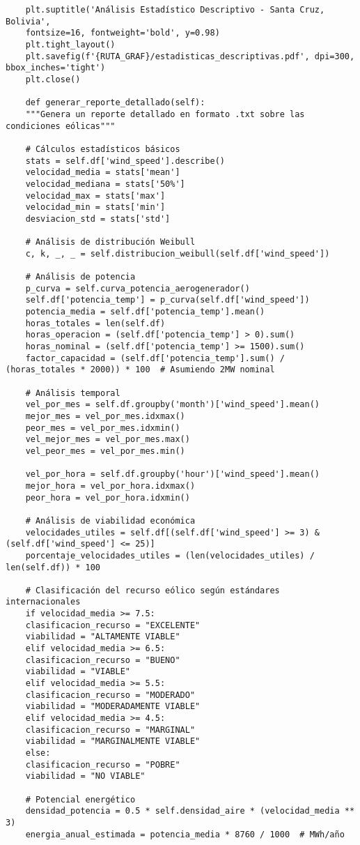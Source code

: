 \begin{lstlisting}
	plt.suptitle('Análisis Estadístico Descriptivo - Santa Cruz, Bolivia', 
	fontsize=16, fontweight='bold', y=0.98)
	plt.tight_layout()
	plt.savefig(f'{RUTA_GRAF}/estadisticas_descriptivas.pdf', dpi=300, bbox_inches='tight')
	plt.close()
	
	def generar_reporte_detallado(self):
	"""Genera un reporte detallado en formato .txt sobre las condiciones eólicas"""
	
	# Cálculos estadísticos básicos
	stats = self.df['wind_speed'].describe()
	velocidad_media = stats['mean']
	velocidad_mediana = stats['50%']
	velocidad_max = stats['max']
	velocidad_min = stats['min']
	desviacion_std = stats['std']
	
	# Análisis de distribución Weibull
	c, k, _, _ = self.distribucion_weibull(self.df['wind_speed'])
	
	# Análisis de potencia
	p_curva = self.curva_potencia_aerogenerador()
	self.df['potencia_temp'] = p_curva(self.df['wind_speed'])
	potencia_media = self.df['potencia_temp'].mean()
	horas_totales = len(self.df)
	horas_operacion = (self.df['potencia_temp'] > 0).sum()
	horas_nominal = (self.df['potencia_temp'] >= 1500).sum()
	factor_capacidad = (self.df['potencia_temp'].sum() / (horas_totales * 2000)) * 100  # Asumiendo 2MW nominal
	
	# Análisis temporal
	vel_por_mes = self.df.groupby('month')['wind_speed'].mean()
	mejor_mes = vel_por_mes.idxmax()
	peor_mes = vel_por_mes.idxmin()
	vel_mejor_mes = vel_por_mes.max()
	vel_peor_mes = vel_por_mes.min()
	
	vel_por_hora = self.df.groupby('hour')['wind_speed'].mean()
	mejor_hora = vel_por_hora.idxmax()
	peor_hora = vel_por_hora.idxmin()
	
	# Análisis de viabilidad económica
	velocidades_utiles = self.df[(self.df['wind_speed'] >= 3) & (self.df['wind_speed'] <= 25)]
	porcentaje_velocidades_utiles = (len(velocidades_utiles) / len(self.df)) * 100
	
	# Clasificación del recurso eólico según estándares internacionales
	if velocidad_media >= 7.5:
	clasificacion_recurso = "EXCELENTE"
	viabilidad = "ALTAMENTE VIABLE"
	elif velocidad_media >= 6.5:
	clasificacion_recurso = "BUENO"
	viabilidad = "VIABLE"
	elif velocidad_media >= 5.5:
	clasificacion_recurso = "MODERADO"
	viabilidad = "MODERADAMENTE VIABLE"
	elif velocidad_media >= 4.5:
	clasificacion_recurso = "MARGINAL"
	viabilidad = "MARGINALMENTE VIABLE"
	else:
	clasificacion_recurso = "POBRE"
	viabilidad = "NO VIABLE"
	
	# Potencial energético
	densidad_potencia = 0.5 * self.densidad_aire * (velocidad_media ** 3)
	energia_anual_estimada = potencia_media * 8760 / 1000  # MWh/año
	

\end{lstlisting}
